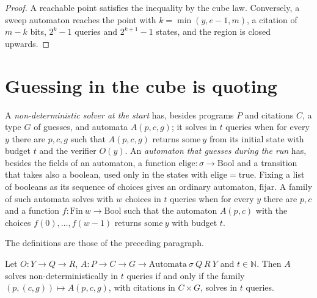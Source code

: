 \begin{proof}
  \leanok
  A reachable point satisfies the inequality by the cube law. Conversely, a sweep automaton
  reaches the point with $k = \min(y, e-1, m)$, a citation of $m - k$ bits, $2^k - 1$ queries and
  $2^{k+1} - 1$ states, and the region is closed upwards.
\end{proof}

\section{Guessing in the cube is quoting}
\label{sec:dynamics-nd}

A \emph{non-deterministic solver at the start} has, besides programs $P$ and citations $C$, a type
$G$ of guesses, and automata $A(p, c, g)$; it solves in $t$ queries when for every $y$ there are
$p, c, g$ such that $A(p,c,g)$ returns $\mathrm{some}\ y$ from its initial state with budget $t$ and
the verifier $O(y)$. An \emph{automaton that guesses during the run} has, besides the fields of an
automaton, a function $\mathrm{elige} : \sigma \to \mathrm{Bool}$ and a transition that takes also
a boolean, used only in the states with $\mathrm{elige} = \mathrm{true}$. Fixing a list of booleans
as its sequence of choices gives an ordinary automaton, $\mathrm{fijar}$. A family of such
automata solves with $w$ choices in $t$ queries when for every $y$ there are $p, c$ and a function
$f : \mathrm{Fin}\ w \to \mathrm{Bool}$ such that the automaton $A(p,c)$ with the choices
$f(0), \dots, f(w-1)$ returns $\mathrm{some}\ y$ with budget $t$.

\begin{definition}
  \label{def:dynamics-nd}
  \leanok
  The definitions are those of the preceding paragraph.
  \own{}
\end{definition}

\begin{theorem}
  \label{thm:dynamics-nd-quote}
  \leanok
  Let $O : Y \to Q \to R$, $A : P \to C \to G \to \mathrm{Automata}\ \sigma\ Q\ R\ Y$ and
  $t \in \mathbb{N}$. Then $A$ solves non-deterministically in $t$ queries if and only if the
  family $(p, (c, g)) \mapsto A(p, c, g)$, with citations in $C \times G$, solves in $t$ queries.
  \own{}
\end{theorem}

